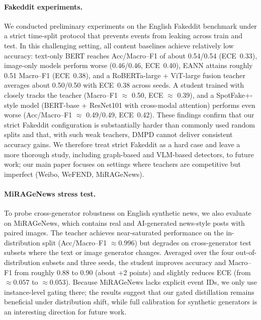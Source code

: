 \paragraph{Fakeddit experiments.} We conducted preliminary experiments on the English Fakeddit benchmark under a strict time-split protocol that prevents events from leaking across train and test. In this challenging setting, all content baselines achieve relatively low accuracy: text-only BERT reaches Acc/Macro--F1 of about 0.54/0.54 (ECE~0.33), image-only models perform worse (0.46/0.46, ECE~0.40), EANN attains roughly 0.51 Macro--F1 (ECE~0.38), and a RoBERTa-large + ViT-large fusion teacher averages about 0.50/0.50 with ECE~0.38 across seeds. A student trained with \modelname{} closely tracks the teacher (Macro--F1 $\approx$ 0.50, ECE $\approx$ 0.39), and a SpotFake+-style model (BERT-base + ResNet101 with cross-modal attention) performs even worse (Acc/Macro--F1 $\approx$ 0.49/0.49, ECE~0.42). These findings confirm that our strict Fakeddit configuration is substantially harder than commonly used random splits and that, with such weak teachers, DMPD cannot deliver consistent accuracy gains. We therefore treat strict Fakeddit as a hard case and leave a more thorough study, including graph-based and VLM-based detectors, to future work; our main paper focuses on settings where teachers are competitive but imperfect (Weibo, WeFEND, MiRAGeNews).

\paragraph{MiRAGeNews stress test.} To probe cross-generator robustness on English synthetic news, we also evaluate \modelname{} on MiRAGeNews, which contains real and AI-generated news-style posts with paired images. The teacher achieves near-saturated performance on the in-distribution split (Acc/Macro--F1 $\approx 0.996$) but degrades on cross-generator test subsets where the text or image generator changes. Averaged over the four out-of-distribution subsets and three seeds, the student improves accuracy and Macro--F1 from roughly 0.88 to 0.90 (about +2 points) and slightly reduces ECE (from $\approx 0.057$ to $\approx 0.053$). Because MiRAGeNews lacks explicit event IDs, we only use instance-level gating there; the results suggest that our gated distillation remains beneficial under distribution shift, while full calibration for synthetic generators is an interesting direction for future work.

